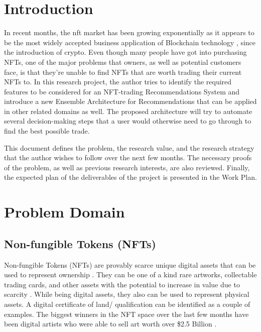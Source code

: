 \documentclass[a4paper, 12pt, oneside]{report}
\begin{document}

\tableofcontents

{\let\clearpage\relax
\listoffigures}
{\let\clearpage\relax
\listoftables}
{\let\clearpage\relax
\printglossary[type=\acronymtype
]}


\onehalfspacing %

\chapter{Introduction}

\setcounter{page}{1} %

In recent months, the \Gls{nft} market has been growing exponentially as it appears to be the most widely accepted business application of Blockchain technology \autocite{dowling_is_2021}, since the introduction of crypto. Even though many people have got into purchasing NFTs, one of the major problems that owners, as well as potential customers face, is that they’re unable to find NFTs that are worth trading their current NFTs to. In this research project, the author tries to identify the required features to be considered for an NFT-trading Recommendations System and introduce a new Ensemble Architecture for Recommendations that can be applied in other related domains as well. The proposed architecture will try to automate several decision-making steps that a user would otherwise need to go through to find the best possible trade.

This document defines the problem, the research value, and the research strategy that the author wishes to follow over the next few months. The necessary proofs of the problem, as well as previous research interests, are also reviewed. Finally, the expected plan of the deliverables of the project is presented in the Work Plan.


\begingroup
\let\clearpage\relax


\chapter{Problem Domain}
\section{Non-fungible Tokens (NFTs)}
Non-fungible Tokens (NFTs) are provably scarce unique digital assets that can be used to represent ownership \autocite{noauthor_erc-721_nodate}.
They can be one of a kind rare artworks, collectable trading cards, and other assets with the potential to increase in value due to scarcity \autocite{conti_what_2021, fairfield_tokenized_2021}. While being digital assets, they also can be used to represent physical assets. A digital certificate of land/ qualification can be identified as a couple of examples. The biggest winners in the NFT space over the last few months have been digital artists who were able to sell art worth over \$2.5 Billion \parencite{noauthor_off_2021}.
\end{document}
